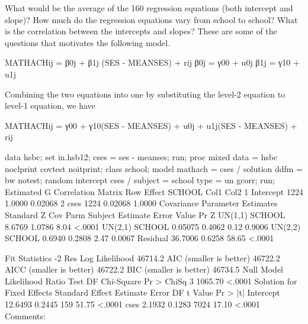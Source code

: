 What would be the average of the 160 regression equations (both intercept and slope)?
How much do the regression equations vary from school to school?
What is the correlation between the intercepts and slopes?
These are some of the questions that motivates the following model.

MATHACHij =  β0j + β1j (SES - MEANSES) + rij   
β0j =  γ00  + u0j
β1j =  γ10  + u1j

Combining the two equations into one by substituting the level-2 equation to level-1 equation, we have

MATHACHij =  γ00  + γ10(SES - MEANSES) + u0j +  u1j(SES - MEANSES) + rij  

data hsbc;
  set in.hsb12;
    cses = ses - meanses;
run;
proc mixed data = hsbc noclprint covtest noitprint;
  class school;
  model mathach = cses / solution ddfm = bw notest;
  random intercept cses / subject = school type = un gcorr;
run;
           Estimated G Correlation Matrix
 Row    Effect       SCHOOL        Col1        Col2
   1    Intercept    1224        1.0000     0.02068
   2    cses         1224       0.02068      1.0000
                  Covariance Parameter Estimates
                                    Standard         Z
Cov Parm     Subject    Estimate       Error     Value        Pr Z
UN(1,1)      SCHOOL       8.6769      1.0786      8.04      <.0001
UN(2,1)      SCHOOL      0.05075      0.4062      0.12      0.9006
UN(2,2)      SCHOOL       0.6940      0.2808      2.47      0.0067
Residual                 36.7006      0.6258     58.65      <.0001

           Fit Statistics
-2 Res Log Likelihood         46714.2
AIC (smaller is better)       46722.2
AICC (smaller is better)      46722.2
BIC (smaller is better)       46734.5
  Null Model Likelihood Ratio Test
    DF    Chi-Square      Pr > ChiSq
     3       1065.70          <.0001
                   Solution for Fixed Effects
                         Standard
Effect       Estimate       Error      DF    t Value    Pr > |t|
Intercept     12.6493      0.2445     159      51.75      <.0001
cses           2.1932      0.1283    7024      17.10      <.0001
Comments:

